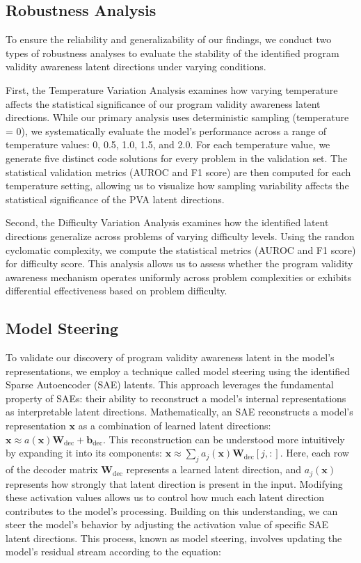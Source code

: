 \subsection{Robustness Analysis}

To ensure the reliability and generalizability of our findings, we conduct two types of robustness analyses to evaluate the stability of the identified program validity awareness latent directions under varying conditions.

First, the Temperature Variation Analysis examines how varying temperature affects the statistical significance of our program validity awareness latent directions. While our primary analysis uses deterministic sampling (temperature = 0), we systematically evaluate the model's performance across a range of temperature values: 0, 0.5, 1.0, 1.5, and 2.0. For each temperature value, we generate five distinct code solutions for every problem in the validation set. The statistical validation metrics (AUROC and F1 score) are then computed for each temperature setting, allowing us to visualize how sampling variability affects the statistical significance of the PVA latent directions.

Second, the Difficulty Variation Analysis examines how the identified latent directions generalize across problems of varying difficulty levels. Using the randon cyclomatic complexity, we compute the statistical metrics (AUROC and F1 score) for difficulty score. This analysis allows us to assess whether the program validity awareness mechanism operates uniformly across problem complexities or exhibits differential effectiveness based on problem difficulty.

\subsection{Model Steering}

To validate our discovery of program validity awareness latent in the model's representations, we employ a technique called model steering using the identified Sparse Autoencoder (SAE) latents. This approach leverages the fundamental property of SAEs: their ability to reconstruct a model's internal representations as interpretable latent directions. Mathematically, an SAE reconstructs a model's representation $\mathbf{x}$ as a combination of learned latent directions: $\mathbf{x} \approx a(\mathbf{x})\mathbf{W}_{\text{dec}} + \mathbf{b}_{\text{dec}}$.
This reconstruction can be understood more intuitively by expanding it into its components: $\mathbf{x} \approx \sum_j a_j(\mathbf{x})\mathbf{W}_{\text{dec}}[j,:]$. Here, each row of the decoder matrix $\mathbf{W}_{\text{dec}}$ represents a learned latent direction, and $a_j(\mathbf{x})$ represents how strongly that latent direction is present in the input. Modifying these activation values allows us to control how much each latent direction contributes to the model's processing.
Building on this understanding, we can steer the model's behavior by adjusting the activation value of specific SAE latent directions. This process, known as model steering, involves updating the model's residual stream according to the equation:

